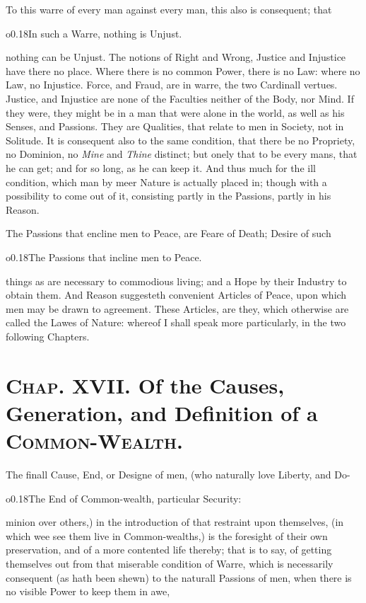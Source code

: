 To this warre of every man against every man, this also is consequent;
that \begin{wrapfigure}[4]{o}{0.18\textwidth}\wrapadj In such a Warre,
nothing is Unjust. \end{wrapfigure} nothing can be Unjust. The notions
of Right and Wrong, Justice and Injustice have there no place. Where
there is no common Power, there is no Law: where no Law, no Injustice.
Force, and Fraud, are in warre, the two Cardinall vertues. Justice,
and Injustice are none of the Faculties neither of the Body, nor Mind.
If they were, they might be in a man that were alone in the world, as
well as his Senses, and Passions. They are Qualities, that relate to
men in Society, not in Solitude. It is consequent also to the same
condition, that there be no Propriety, no Dominion, no \textit{Mine}
and \textit{Thine} distinct; but onely that to be every mans, that he
can get; and for so long, as he can keep it. And thus much for the ill
condition, which man by meer Nature is actually  placed in;
though with a possibility to come out of it, consisting partly in the
Passions, partly in his Reason.

The Passions that encline men to Peace, are Feare of Death; Desire of
such \begin{wrapfigure}[4]{o}{0.18\textwidth}\wrapadj The Passions that
incline men to Peace. \end{wrapfigure} things as are necessary to
commodious living; and a Hope by their Industry to obtain them. And
Reason suggesteth convenient Articles of Peace, upon which men may be
drawn to agreement. These Articles, are they, which otherwise are
called the Lawes of Nature: whereof I shall speak more particularly,
in the two following Chapters.


\section*{\textsc{Chap}. XVII. Of the Causes, Generation,
and Definition of a \textsc{Common-Wealth}.}

The finall Cause, End, or Designe of men, (who naturally love Liberty,
and Do- \begin{wrapfigure}[4]{o}{0.18\textwidth}\wrapadj The End of
Common-wealth, particular Security: \end{wrapfigure} minion over
others,) in the introduction of that restraint upon themselves, (in
which wee see them live in Common-wealths,) is the foresight of their
own preservation, and of a more contented life thereby; that is to
say, of getting themselves out from that miserable condition of Warre,
which is necessarily consequent (as hath been shewn) to the naturall
Passions of men, when there is no visible Power to keep them in awe,

